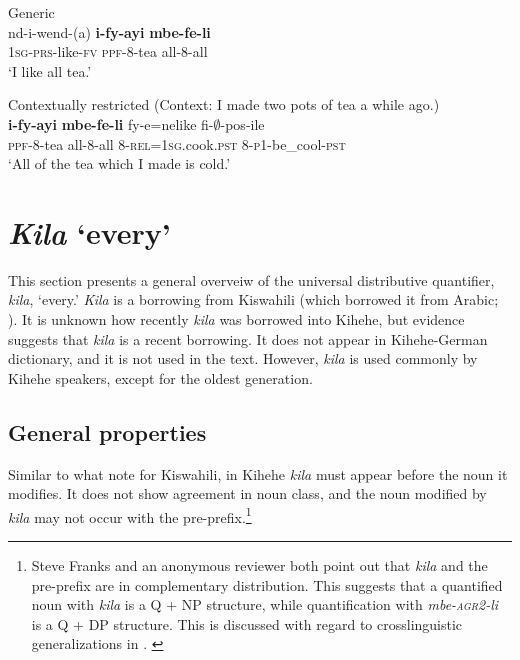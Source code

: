 \documentclass[output=paper,modfonts,nonflat]{langsci/langscibook}
\begin{document}
\begin{exe}

\ex \begin{xlist} \label{ex:kaspercushman:drinktea}
\ex Generic\\
\gll nd-i-wend-(a) \textbf{i-fy-ayi} \textbf{mbe-fe-li} \\
\textsc{1sg}-\textsc{prs}-like-\textsc{fv} \textsc{ppf}-8-tea all-8-all \\
\glt `I like all tea.'

\ex Contextually restricted (Context: I made two pots of tea a while ago.)\\
\gll \textbf{i-fy-ayi} \textbf{mbe-fe-li} fy-e=nelike fi-$\emptyset$-pos-ile \\
\textsc{ppf}-8-tea all-8-all 8-\textsc{rel}=\textsc{1sg}.cook.\textsc{pst} 8-\textsc{p1}-be\_cool-\textsc{pst} \\
\glt `All of the tea which I made is cold.' 

\end{xlist}
\end{exe}



\section{\emph{Kila} `every'} \label{sec:kaspercushman:every}\label{sec:kasper:3}
This section presents a general overveiw of the universal distributive quantifier, \textit{kila}, `every.' \textit{Kila} is a borrowing from Kiswahili (which borrowed it from Arabic; \citealt{zerbian08}). It is unknown how recently \textit{kila} was borrowed into Kihehe, but evidence suggests that \textit{kila} is a recent borrowing. It does not appear in  Kihehe-German dictionary, and it is not used in the \citeauthor{ex:kaspercushman:luwuko} text. However, \textit{kila} is used commonly by Kihehe speakers, except for the oldest generation.

\subsection{General properties}

Similar to what \citealt{zerbian08} note for Kiswahili, in Kihehe \textit{kila} must appear before the noun it modifies. It does not show agreement in noun class, and the noun modified by \textit{kila} may not occur with the pre-prefix.\footnote{Steve
    Franks and an anonymous reviewer both point out that \textit{kila} and the pre-prefix are in complementary distribution.  This suggests that a quantified noun with \textit{kila} is a Q + NP structure, while quantification with \textit{mbe-\textsc{agr2}-li} is a Q + DP structure. This is discussed with regard to crosslinguistic generalizations in . \label{foot:kaspercushman:1}
}
\end{document}

